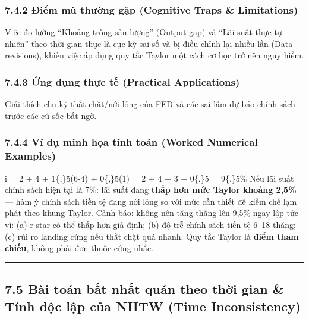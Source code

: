 \documentclass[
]{article}
\begin{document}
\subsubsection{7.4.2 Điểm mù thường gặp (Cognitive Traps \&
Limitations)}\label{ux111iux1ec3m-muxf9-thux1b0ux1eddng-gux1eb7p-cognitive-traps-limitations-38}

Việc đo lường ``Khoảng trống sản lượng'' (Output gap) và ``Lãi suất thực
tự nhiên'' theo thời gian thực là cực kỳ sai số và bị điều chỉnh lại
nhiều lần (Data revisions), khiến việc áp dụng quy tắc Taylor một cách
cơ học trở nên nguy hiểm.

\subsubsection{7.4.3 Ứng dụng thực tế (Practical
Applications)}\label{ux1ee9ng-dux1ee5ng-thux1ef1c-tux1ebf-practical-applications-20}

Giải thích chu kỳ thắt chặt/nới lỏng của FED và các sai lầm dự báo chính
sách trước các cú sốc bất ngờ.

\subsubsection{7.4.4 Ví dụ minh họa tính toán (Worked Numerical
Examples)}\label{vuxed-dux1ee5-minh-hux1ecda-tuxednh-touxe1n-worked-numerical-examples-19}

i = 2 + 4 + 1\{,\}5(6-4) + 0\{,\}5(1) = 2 + 4 + 3 + 0\{,\}5 = 9\{,\}5\%
Nếu lãi suất chính sách hiện tại là 7\%: lãi suất đang \textbf{thấp hơn
mức Taylor khoảng 2,5\%} --- hàm ý chính sách tiền tệ đang nới lỏng so
với mức cần thiết để kiềm chế lạm phát theo khung Taylor. Cảnh báo:
không nên tăng thẳng lên 9,5\% ngay lập tức vì: (a) r-star có thể thấp
hơn giả định; (b) độ trễ chính sách tiền tệ 6--18 tháng; (c) rủi ro
landing cứng nếu thắt chặt quá nhanh. Quy tắc Taylor là \textbf{điểm
tham chiếu}, không phải đơn thuốc cứng nhắc.

\begin{center}\rule{0.5\linewidth}{0.5pt}\end{center}

\subsection{7.5 Bài toán bất nhất quán theo thời gian \& Tính độc lập
của NHTW (Time
Inconsistency)}\label{buxe0i-touxe1n-bux1ea5t-nhux1ea5t-quuxe1n-theo-thux1eddi-gian-tuxednh-ux111ux1ed9c-lux1eadp-cux1ee7a-nhtw-time-inconsistency}
\end{document}
